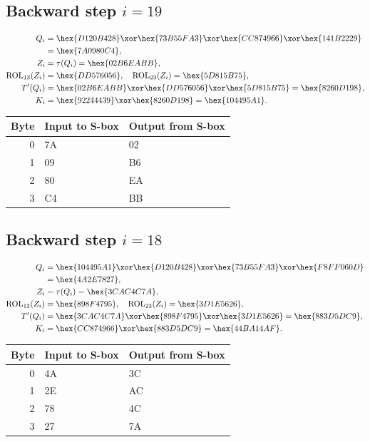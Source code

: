 \subsection*{Backward step $i=19$}
\begin{align*}
Q_i&=\hex{D120B428}\xor\hex{73B55FA3}\xor\hex{CC874966}\xor\hex{141B2229}\\&=\hex{7A0980C4},\\
Z_i&=\tau(Q_i)=\hex{02B6EABB},\\
\operatorname{ROL}_{13}(Z_i)&=\hex{DD576056},\quad\operatorname{ROL}_{23}(Z_i)=\hex{5D815B75},\\
T'(Q_i)&=\hex{02B6EABB}\xor\hex{DD576056}\xor\hex{5D815B75}=\hex{8260D198},\\
K_i&=\hex{92244439}\xor\hex{8260D198}=\hex{104495A1}.\end{align*}
\begingroup\small
\begin{longtable}{rll}
\toprule
Byte & Input to S-box & Output from S-box\\\midrule
\endhead
0 & 7A & 02\\
1 & 09 & B6\\
2 & 80 & EA\\
3 & C4 & BB\\
\bottomrule\end{longtable}
\endgroup
\subsection*{Backward step $i=18$}
\begin{align*}
Q_i&=\hex{104495A1}\xor\hex{D120B428}\xor\hex{73B55FA3}\xor\hex{F8FF060D}\\&=\hex{4A2E7827},\\
Z_i&=\tau(Q_i)=\hex{3CAC4C7A},\\
\operatorname{ROL}_{13}(Z_i)&=\hex{898F4795},\quad\operatorname{ROL}_{23}(Z_i)=\hex{3D1E5626},\\
T'(Q_i)&=\hex{3CAC4C7A}\xor\hex{898F4795}\xor\hex{3D1E5626}=\hex{883D5DC9},\\
K_i&=\hex{CC874966}\xor\hex{883D5DC9}=\hex{44BA14AF}.\end{align*}
\begingroup\small
\begin{longtable}{rll}
\toprule
Byte & Input to S-box & Output from S-box\\\midrule
\endhead
0 & 4A & 3C\\
1 & 2E & AC\\
2 & 78 & 4C\\
3 & 27 & 7A\\
\bottomrule\end{longtable}
\endgroup
